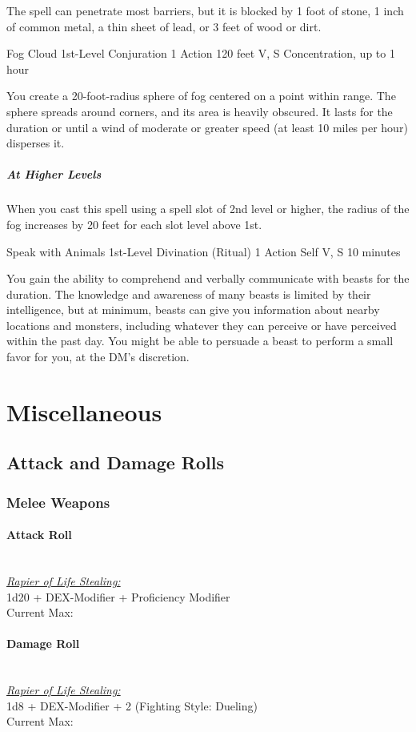 \documentclass[letterpaper,openany,oneside,twocolumn]{book}
\begin{document}
The spell can penetrate most barriers, but it is blocked by 1 foot of stone, 1 inch of common metal, a thin sheet of lead, or 3 feet of wood or dirt.

\DndSpellHeader
  {Fog Cloud}
  {1st-Level Conjuration}
  {1 Action}
  {120 feet}
  {V, S}
  {Concentration, up to 1 hour}

You create a 20-foot-radius sphere of fog centered on a point within range. The sphere spreads around corners, and its area is heavily obscured. It lasts for the duration or until a wind of moderate or greater speed (at least 10 miles per hour) disperses it.

\subparagraph*{At Higher Levels} When you cast this spell using a spell slot of 2nd level or higher, the radius of the fog increases by 20 feet for each slot level above 1st.

\DndSpellHeader
  {Speak with Animals}
  {1st-Level Divination (Ritual)}
  {1 Action}
  {Self}
  {V, S}
  {10 minutes}

You gain the ability to comprehend and verbally communicate with beasts for the duration. The knowledge and awareness of many beasts is limited by their intelligence, but at minimum, beasts can give you information about nearby locations and monsters, including whatever they can perceive or have perceived within the past day. You might be able to persuade a beast to perform a small favor for you, at the DM's discretion.
\vfill\eject
\section*{Miscellaneous}
\subsection*{Attack and Damage Rolls}
\subsubsection*{Melee Weapons}
\paragraph*{Attack Roll}\hfill\\
\underline{\textit{Rapier of Life Stealing:}}\\
1d20 + DEX-Modifier + Proficiency Modifier\\
\indent Current Max: 
\paragraph*{Damage Roll}\hfill\\
\underline{\textit{Rapier of Life Stealing:}}\\
1d8 + DEX-Modifier + 2 (Fighting Style: Dueling)\\
\indent Current Max: 
\end{document}
